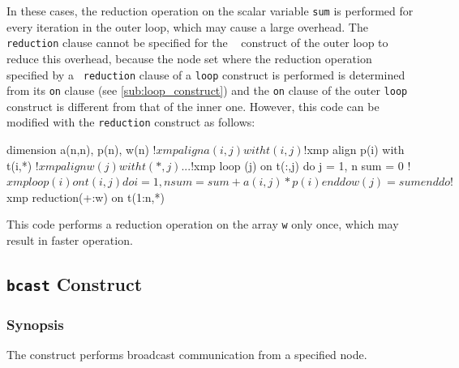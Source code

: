 \begin{description}

In these cases, the reduction operation on the scalar variable {\tt sum}
is performed for every iteration in the outer loop, which may cause a
large overhead.
The {\tt reduction} clause cannot be specified for the {\tt
{}} construct of the outer loop to reduce this overhead,
%
because the node set where the reduction operation specified by a {\tt
reduction} clause of a {\tt loop} construct is performed is determined
from its {\tt on} clause (see \ref{sub:loop_construct}) and
the {\tt on} clause of the outer {\tt loop} construct is different from
that of the inner one. 
%
However, this code can be modified with the {\tt reduction}
construct as follows: 

\begin{XFexample}
      dimension a(n,n), p(n), w(n)
!$xmp align a(i,j) with t(i,j)
!$xmp align p(i) with t(i,*)
!$xmp align w(j) with t(*,j)
      ...
!$xmp loop (j) on t(:,j)
      do j = 1, n
          sum = 0
!$xmp loop (i) on t(i,j) 
          do i = 1, n
              sum = sum + a(i,j) * p(i)
          end do
          w(j) = sum
      end do
!$xmp reduction(+:w) on t(1:n,*)
\end{XFexample}

This code performs a reduction operation on the array {\tt w} only once,
which may result in faster operation.  

\end{description}


\subsection{{\tt bcast} Construct}

\subsubsection*{Synopsis}

The {\tt {}} construct performs broadcast communication
from a specified node.

